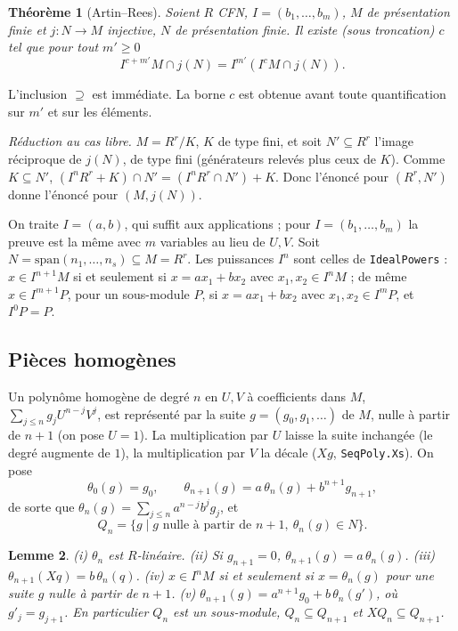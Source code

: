\documentclass[11pt]{amsart}
\newtheorem{theorem}{Théorème}
\newtheorem{lemma}[theorem]{Lemme}
\theoremstyle{definition}
\theoremstyle{remark}
\newcommand{\sm}{\mathrm{span}}
\begin{document}
\begin{theorem}[Artin--Rees]\label{thm:ar}
Soient $R$ CFN, $I=(b_1,\dots,b_m)$, $M$ de présentation finie et
$j:N\to M$ injective, $N$ de présentation finie. Il existe (sous
troncation) $c$ tel que pour tout $m'\ge0$
\[I^{c+m'}M\cap j(N)=I^{m'}(I^cM\cap j(N)).\]
\end{theorem}

L'inclusion $\supseteq$ est immédiate. La borne $c$ est obtenue avant
toute quantification sur $m'$ et sur les éléments.

\emph{Réduction au cas libre.} $M=R^r/K$, $K$ de type fini, et soit
$N'\subseteq R^r$ l'image réciproque de $j(N)$, de type fini (générateurs
relevés plus ceux de $K$). Comme $K\subseteq N'$,
$(I^nR^r+K)\cap N'=(I^nR^r\cap N')+K$. Donc l'énoncé pour
$(R^r,N')$ donne l'énoncé pour $(M,j(N))$.

On traite $I=(a,b)$, qui suffit aux applications ; pour
$I=(b_1,\dots,b_m)$ la preuve est la même avec $m$ variables au lieu de
$U,V$. Soit $N=\sm(n_1,\dots,n_s)\subseteq M=R^r$. Les puissances $I^n$
sont celles de \texttt{IdealPowers} : $x\in I^{n+1}M$ si et seulement si
$x=ax_1+bx_2$ avec $x_1,x_2\in I^nM$ ; de même
$x\in I^{m+1}P$, pour un sous-module $P$, si $x=ax_1+bx_2$ avec
$x_1,x_2\in I^mP$, et $I^0P=P$.

\subsection{Pièces homogènes}
Un polynôme homogène de degré $n$ en $U,V$ à coefficients dans $M$,
$\sum_{j\le n}g_jU^{n-j}V^j$, est représenté par la suite
$g=(g_0,g_1,\dots)$ de $M$, nulle à partir de $n+1$ (on pose $U=1$). La
multiplication par $U$ laisse la suite inchangée (le degré augmente de
$1$), la multiplication par $V$ la décale ($Xg$, \texttt{SeqPoly.Xs}).
On pose
\[\theta_0(g)=g_0,\qquad \theta_{n+1}(g)=a\,\theta_n(g)+b^{n+1}g_{n+1},\]
de sorte que $\theta_n(g)=\sum_{j\le n}a^{n-j}b^jg_j$, et
\[Q_n=\{g\mid g\text{ nulle à partir de }n+1,\ \theta_n(g)\in N\}.\]

\begin{lemma}\label{lem:theta}
(i) $\theta_n$ est $R$-linéaire. (ii) Si $g_{n+1}=0$,
$\theta_{n+1}(g)=a\,\theta_n(g)$. (iii) $\theta_{n+1}(Xq)=b\,\theta_n(q)$.
(iv) $x\in I^nM$ si et seulement si $x=\theta_n(g)$ pour une suite $g$
nulle à partir de $n+1$. (v) $\theta_{n+1}(g)=a^{n+1}g_0+b\,\theta_n(g')$,
où $g'_j=g_{j+1}$. En particulier $Q_n$ est un sous-module,
$Q_n\subseteq Q_{n+1}$ et $XQ_n\subseteq Q_{n+1}$.
\end{lemma}
\end{document}
